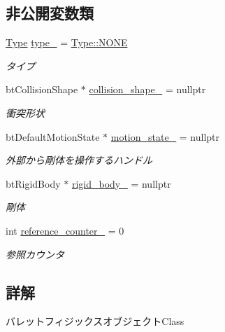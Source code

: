 \subsection*{非公開変数類}
\begin{DoxyCompactItemize}
\item 
\mbox{\hyperlink{class_bullet_physics_object_ac428a5598df5fd4a450197e021420927}{Type}} \mbox{\hyperlink{class_bullet_physics_object_a89ca999874ab6113c1dca6e5091db62f}{type\+\_\+}} = \mbox{\hyperlink{class_bullet_physics_object_ac428a5598df5fd4a450197e021420927ab50339a10e1de285ac99d4c3990b8693}{Type\+::\+N\+O\+NE}}
\begin{DoxyCompactList}\small\item\em タイプ \end{DoxyCompactList}\item 
bt\+Collision\+Shape $\ast$ \mbox{\hyperlink{class_bullet_physics_object_a1dfb431c0eefdacf3cfc1ba3ae104457}{collision\+\_\+shape\+\_\+}} = nullptr
\begin{DoxyCompactList}\small\item\em 衝突形状 \end{DoxyCompactList}\item 
bt\+Default\+Motion\+State $\ast$ \mbox{\hyperlink{class_bullet_physics_object_a1ea7b5057265c9a926acf3ae51dd8853}{motion\+\_\+state\+\_\+}} = nullptr
\begin{DoxyCompactList}\small\item\em 外部から剛体を操作するハンドル \end{DoxyCompactList}\item 
bt\+Rigid\+Body $\ast$ \mbox{\hyperlink{class_bullet_physics_object_a95bcfe681fee31cafe9f4ddf8d17a3fd}{rigid\+\_\+body\+\_\+}} = nullptr
\begin{DoxyCompactList}\small\item\em 剛体 \end{DoxyCompactList}\item 
int \mbox{\hyperlink{class_bullet_physics_object_ae36c0b40461016b4c4a536c624ca6061}{reference\+\_\+counter\+\_\+}} = 0
\begin{DoxyCompactList}\small\item\em 参照カウンタ \end{DoxyCompactList}\end{DoxyCompactItemize}


\subsection{詳解}
バレットフィジックスオブジェクト\+Class 

